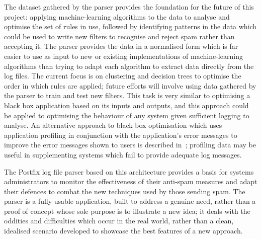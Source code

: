 \documentclass[draft]{svmult}
\begin{document}
The dataset gathered by the parser provides the foundation for the future
of this project: applying machine-learning algorithms to the data to
analyse and optimise the set of rules in use, followed by identifying
patterns in the data which could be used to write new filters to recognise
and reject spam rather than accepting it.  The parser provides the data in
a normalised form which is far easier to use as input to new or existing
implementations of machine-learning algorithms than trying to adapt each
algorithm to extract data directly from the log files.  The current focus
is on clustering and decision trees to optimise the order in which rules
are applied; future efforts will involve using data gathered by the parser
to train and test new filters.  This task is very similar to optimising a
black box application based on its inputs and outputs, and this approach
could be applied to optimising the behaviour of any system given sufficient
logging to analyse.  An alternative approach to black box optimisation
which uses application profiling in conjunction with the application's
error messages to improve the error messages shown to users is described
in~\cite{black-box-error-reporting}; profiling data may be useful in
supplementing systems which fail to provide adequate log messages.

The Postfix log file parser based on this architecture provides a basis for
systems administrators to monitor the effectiveness of their anti-spam
measures and adapt their defences to combat the new techniques used by
those sending spam.  The parser is a fully usable application, built to
address a genuine need, rather than a proof of concept whose sole purpose
is to illustrate a new idea; it deals with the oddities and difficulties
which occur in the real world, rather than a clean, idealised scenario
developed to showcase the best features of a new approach.



\end{document}
